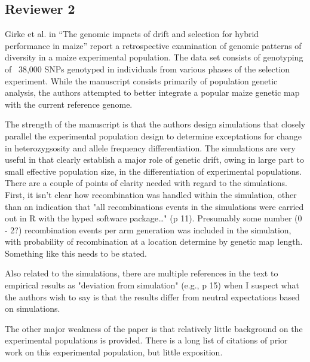\documentclass[onecolumn,oneside,letterpaper]{article}
\begin{document}
\subsection{Reviewer 2}
Girke et al. in ``The genomic impacts of drift and selection for hybrid performance in maize'' report a retrospective examination of genomic patterns of diversity in a maize experimental population. The data set consists of genotyping of ~38,000 SNPs genotyped in individuals from various phases of the selection experiment. While the manuscript consists primarily of population genetic analysis, the authors attempted 
to better integrate a popular maize genetic map with the current reference genome.

The strength of the manuscript is that the authors design simulations that closely parallel the experimental 
population design to determine exceptations for change in heterozygsosity and allele frequency 
differentiation. The simulations are very useful in that clearly establish a major role of genetic drift, owing 
in large part to small effective population size, in the differentiation of experimental populations. There are 
a couple of points of clarity needed with regard to the simulations. First, it isn't clear how recombination 
was handled within the simulation, other than an indication that "all recombinations events in the 
simulations were carried out in R with the hyped software package…" (p 11). Presumably some number (0 - 
2?) recombination events per arm generation was included in the simulation, with probability of 
recombination at a location determine by genetic map length. Something like this needs to be stated. 


Also related to the simulations, there are multiple references in the text to empirical results as "deviation from 
simulation" (e.g., p 15) when I suspect what the authors wish to say is that the results differ from neutral 
expectations based on simulations.


The other major weakness of the paper is that relatively little background on the experimental populations 
is provided. There is a long list of citations of prior work on this experimental population, but little 
exposition.
\end{document}
